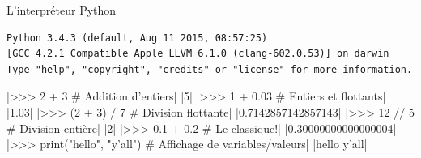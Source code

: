 \documentclass[dvipsnames]{beamer}
\begin{document}
\begin{frame}[fragile]{L'interpréteur Python}

    \begin{verbatim}
Python 3.4.3 (default, Aug 11 2015, 08:57:25)
[GCC 4.2.1 Compatible Apple LLVM 6.1.0 (clang-602.0.53)] on darwin
Type "help", "copyright", "credits" or "license" for more information.
\end{verbatim}

    |>>> 2 + 3                      # Addition d'entiers|\vspace{-1em}
    |5|\vspace{-1em}
    |>>> 1 + 0.03                   # Entiers et flottants|\vspace{-1em}
    |1.03|\vspace{-1em}
    |>>> (2 + 3) / 7                # Division flottante|\vspace{-1em}
    |0.7142857142857143|\vspace{-1em}
    |>>> 12 // 5                    # Division entière|\vspace{-1em}
    |2|\vspace{-1em}
    |>>> 0.1 + 0.2                  # Le classique!|\vspace{-1em}
    |0.30000000000000004|\vspace{-1em}
    |>>> print("hello", "y'all")    # Affichage de variables/valeurs|\vspace{-1em}
    |hello y'all|
\end{frame}

\end{document}
